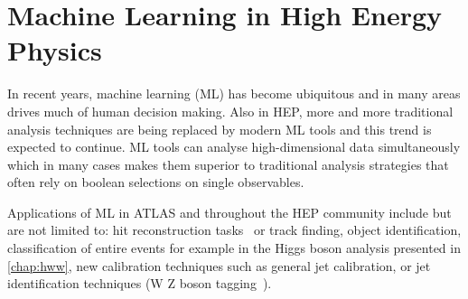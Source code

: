 





\chapter{Machine Learning in High Energy Physics}
\label{chap:ml}

In recent years, machine learning (ML) has become ubiquitous and in many areas drives much of human decision making. 
Also in HEP, more and more traditional analysis techniques are being replaced by modern ML tools and this trend is expected to continue.
ML tools can analyse high-dimensional data simultaneously which in many cases makes them superior to traditional analysis strategies that often rely on boolean selections on single observables. 

Applications of ML in ATLAS and throughout the HEP community include but are not limited to: hit reconstruction tasks~\cite{PERF-2012-05} or track finding, object identification, classification of entire events for example in the Higgs boson analysis presented in \cref{chap:hww}, new calibration techniques such as general jet calibration, or jet identification techniques (W Z boson tagging~\cite{ATL-PHYS-PUB-2021-029}). 




